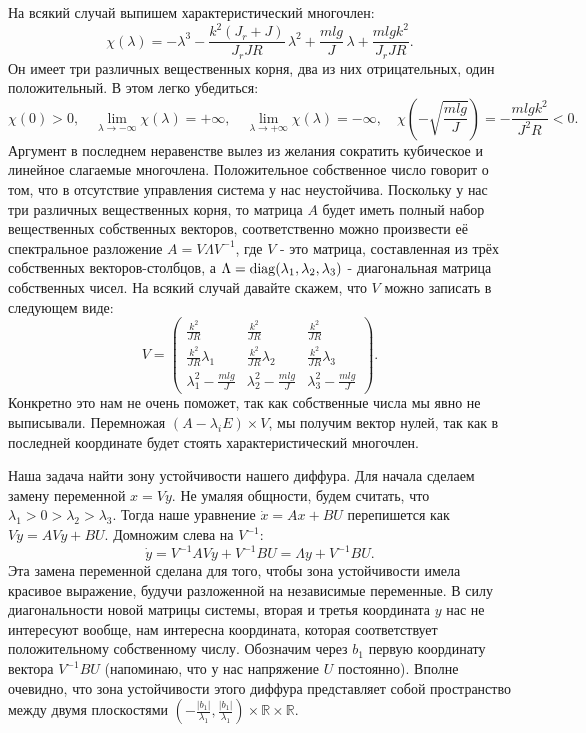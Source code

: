 \documentclass{article}
\DeclarePairedDelimiter{\diagfences}{(}{)}
\newcommand{\diag}{\operatorname{diag}\diagfences}
\begin{document}
На всякий случай выпишем характеристический многочлен:
$$\chi(\lambda) = -\lambda^3 - \frac{k^2(J_r+J)}{J_rJR}\,\lambda^2 + \frac{mlg}{J}\,\lambda+\frac{mlgk^2}{J_rJR}.$$
Он имеет три различных вещественных корня, два из них отрицательных, один положительный. В этом легко убедиться:
$$
\chi(0)>0,\quad \lim\limits_{\lambda\rightarrow-\infty}\chi(\lambda)=+\infty,\quad \lim\limits_{\lambda\rightarrow+\infty}\chi(\lambda)=-\infty,\quad\chi\left(-\sqrt{\frac{mlg}{J}}\right) = -\frac{mlg k^2}{J^2 R}<0.
$$
Аргумент в последнем неравенстве вылез из желания сократить кубическое и линейное слагаемые многочлена.
Положительное собственное число говорит о том, что в отсутствие управления система у нас неустойчива.
Поскольку у нас три различных вещественных корня, то матрица $A$ будет иметь полный набор вещественных собственных векторов, соответственно можно произвести её спектральное разложение $A = V \Lambda V^{-1}$, где $V$ - это матрица, составленная из трёх собственных векторов-столбцов, а $\Lambda=\diag{\lambda_1, \lambda_2, \lambda_3}$ - диагональная матрица собственных чисел.
На всякий случай давайте скажем, что $V$ можно записать в следующем виде:
$$
V=\begin{pmatrix}
\frac{k^2}{JR}              & \frac{k^2}{JR}              & \frac{k^2}{JR}               \\
\frac{k^2}{JR}\lambda_1     & \frac{k^2}{JR}\lambda_2     & \frac{k^2}{JR}\lambda_3      \\
\lambda^2_1 - \frac{mlg}{J} & \lambda^2_2 - \frac{mlg}{J} & \lambda^2_3 - \frac{mlg}{J} 
\end{pmatrix}.
$$
Конкретно это нам не очень поможет, так как собственные числа мы явно не выписывали. Перемножая $(A-\lambda_iE)\times V$, мы получим вектор нулей, так как в последней координате будет стоять характеристический многочлен.

Наша задача найти зону устойчивости нашего диффура. Для начала сделаем замену переменной $x=Vy$.
Не умаляя общности, будем считать, что $\lambda_1>0>\lambda_2>\lambda_3$.
Тогда наше уравнение $\dot x = Ax + BU$ перепишется как $V\dot y = AVy + BU$. Домножим слева на $V^{-1}$: 
$$
\dot y = V^{-1}AVy + V^{-1}BU = \Lambda y + V^{-1}BU.
$$
Эта замена переменной сделана для того, чтобы зона устойчивости имела красивое выражение, будучи разложенной на независимые переменные.
В силу диагональности новой матрицы системы, вторая и третья координата $y$ нас не интересуют вообще, нам интересна координата, которая соответствует положительному собственному числу.
Обозначим через $b_1$ первую координату вектора $V^{-1}BU$ (напоминаю, что у нас напряжение $U$ постоянно).
Вполне очевидно, что зона устойчивости этого диффура представляет собой пространство между двумя плоскостями $\left(-\frac{|b_1|}{\lambda_1}, \frac{|b_1|}{\lambda_1} \right) \times \mathbb R \times \mathbb R$.
\end{document}

